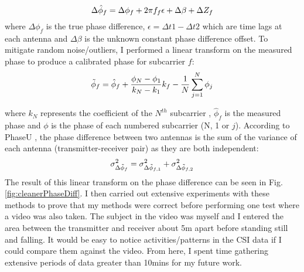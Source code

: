 \vspace{-11pt}
\begin{equation}\label{eqn:3.4}
    \Delta\hat{\phi}_f = \Delta\phi_{f}+2\pi f_{f}\epsilon  + \Delta\beta + \Delta Z_f
    \vspace{-11pt}
\end{equation}
where $\Delta\phi_{f}$ is the true phase difference, $\epsilon = \Delta t1 - \Delta t2$ which are time lags at each antenna and $\Delta\beta$ is the unknown constant phase difference offset. To mitigate random noise/outliers, I performed a linear transform on the measured phase to produce a calibrated phase for subcarrier $f$:
\begin{equation}\label{eqn:3.5}
    \Tilde{\phi}_f = \hat{\phi}_{f}+\frac{\phi_{N}-\phi_{1}}{k_{N}-k_1}k_{f}-\frac{1}{N}\sum_{j=1}^{N} \phi_{j}
    \vspace{-11pt}
\end{equation} \par
where $k_{N}$ represents the coefficient of the $N^{th}$ subcarrier  \citep[p.53]{full802.11nStandard}, $\hat{\phi}_{f}$ is the measured phase and $\phi$ is the phase of each numbered subcarrier (N, 1 or $j$).
According to PhaseU \citep{PhaseU}, the phase difference between two antennas is the sum of the variance of each antenna (transmitter-receiver pair) as they are both independent:
\vspace{-11pt}
\begin{equation}\label{eqn:3.6}
    \sigma^{2}_{\Delta\Tilde{\phi}_f} = \sigma^{2}_{\Delta\Tilde{\phi}_{f,1}} + \sigma^{2}_{\Delta\Tilde{\phi}_{f,2}}
    \vspace{-11pt}
\end{equation} 
The result of this linear transform on the phase difference can be seen in Fig. \ref{fig:cleanerPhaseDiff}. I then carried out extensive experiments with these methods to prove that my methods were correct before performing one test where a video was also taken. The subject in the video was myself and I entered the area between the transmitter and receiver about 5m apart before standing still and falling. It would be easy to notice activities/patterns in the CSI data if I could compare them against the video. From here, I spent time gathering extensive periods of data greater than 10mins for my future work.

